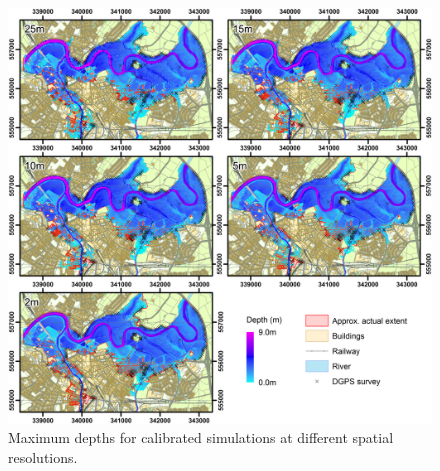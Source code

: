 \documentclass[11pt,english,a4paper]{article}
\begin{document}
\begin{figure}[tpb]
\centering
\includegraphics[width=1.0\textwidth]{Figure5.png}
\caption{Maximum depths for calibrated simulations at different spatial resolutions.}
\label{MaxDepths}
\end{figure}
\end{document}
